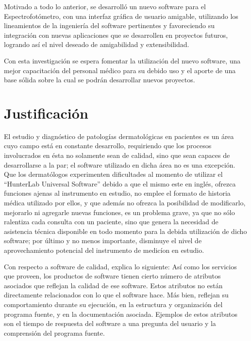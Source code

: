 Motivado a todo lo anterior, se desarroll\'{o} un nuevo software para el Espectrofot\'{o}metro, con una interfaz gr\'{a}fica de usuario amigable, utilizando los lineamientos de la ingenier\'{i}a del software pertinentes y favoreciendo su integraci\'{o}n con nuevas aplicaciones que se desarrollen en proyectos futuros, logrando as\'{i} el nivel deseado de amigabilidad y extensibilidad.

Con esta investigaci\'{o}n se espera fomentar la utilizaci\'{o}n del nuevo software, una mejor capacitaci\'{o}n del personal m\'{e}dico para su debido uso y el aporte de una base s\'{o}lida sobre la cual se podr\'{a}n desarrollar nuevos proyectos.

	\section{Justificaci\'{o}n}
El estudio y diagn\'{o}stico de patolog\'{i}as dermatol\'{o}gicas en pacientes es un \'{a}rea cuyo campo est\'{a} en constante desarrollo, requiriendo que los procesos involucrados en \'{e}sta no solamente sean de calidad, sino que sean capaces de desarrollarse a la par; el software utilizado en dicha \'{a}rea no es una excepci\'{o}n. Que los dermat\'{o}logos experimenten dificultades al momento de utilizar el ``HunterLab Universal Software'' debido a que el mismo este en ingl\'{e}s, ofrezca funciones ajenas al instrumento en estudio, no emplee el formato de historia m\'{e}dica utilizado por ellos, y que adem\'{a}s no ofrezca la posibilidad de modificarlo, mejorarlo ni agregarle nuevas funciones, es un problema grave, ya que no s\'{o}lo ralentiza cada consulta con un paciente, sino que genera la necesidad de asistencia t\'{e}cnica disponible en todo momento para la debida utilizaci\'{o}n de dicho software; por \'{u}ltimo y no menos importante, disminuye el nivel de aprovechamiento potencial del instrumento de medic\'{i}on en estudio.

Con respecto a software de calidad, \cite{Sommerville} explica lo siguiente: As\'{i} como los servicios que proveen, los productos de software tienen cierto n\'{u}mero de atributos asociados que reflejan la calidad de ese software. Estos atributos no est\'{a}n directamente relacionados con lo que el software hace. M\'{a}s bien, reflejan su comportamiento durante su ejecuci\'{o}n, en la estructura y organizaci\'{o}n del programa fuente, y en la documentaci\'{o}n asociada. Ejemplos de estos atributos son el tiempo de respuesta del software a una pregunta del usuario y la comprensi\'{o}n del programa fuente.

